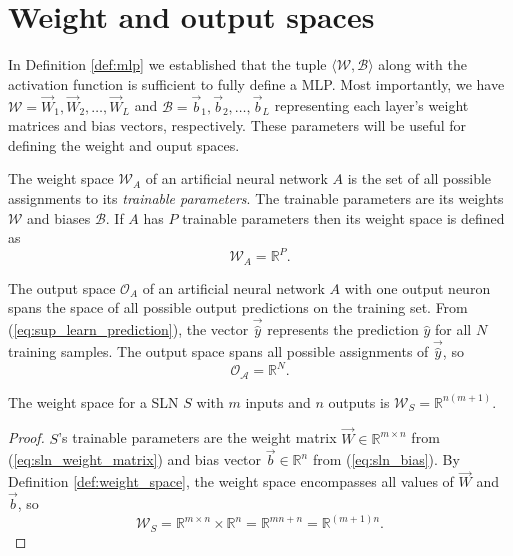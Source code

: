\section{Weight and output spaces}
In Definition \ref{def:mlp} we established that the tuple $\langle \mathscr{W}, \mathscr{B} \rangle$ along with the activation function is sufficient to fully define a MLP. 
Most importantly, we have $\mathscr{W} = \vec{W}_1, \vec{W}_2, \dots, \vec{W}_L$ and $\mathscr{B} = \vec{b}_1, \vec{b}_2, \dots, \vec{b}_L$ representing each layer's weight matrices and bias vectors, respectively. 
These parameters will be useful for defining the weight and ouput spaces.

\begin{definition}
    \label{def:weight_space}
    The weight space $\mathcal{W}_A$ of an artificial neural network $A$ is the set of all possible assignments to its \textit{trainable parameters}. 
    The trainable parameters are its weights $\mathscr{W}$ and biases $\mathscr{B}$.
    If $A$ has $P$ trainable parameters then its weight space is defined as
    \begin{equation}
        \mathcal{W}_A = \mathbb{R}^P.
    \end{equation}
\end{definition}

\begin{definition}
    \label{def:output_space}
    The output space $\mathcal{O}_A$ of an artificial neural network $A$ with one output neuron spans the space of all possible output predictions on the training set.
    From (\ref{eq:sup_learn_prediction}), the vector $\vec{\hat{y}}$ represents the prediction $\hat{y}$ for all $N$ training samples.
    The output space spans all possible assignments of $\vec{\hat{y}}$, so
    \begin{equation}
        \mathcal{O_A}=\mathbb{R}^N.
    \end{equation}
\end{definition}

\begin{lemma}
    \label{lmm:weight_space_sln}
    The weight space for a SLN $S$ with $m$ inputs and $n$ outputs is $\mathcal{W}_S = \mathbb{R}^{n(m+1)}$.
\end{lemma}
\begin{proof}
    $S$'s trainable parameters are the weight matrix $\vec{W} \in \mathbb{R}^{m\times n}$ from (\ref{eq:sln_weight_matrix}) and bias vector $\vec{b} \in \mathbb{R}^n$ from (\ref{eq:sln_bias}).
    By Definition \ref{def:weight_space}, the weight space encompasses all values of $\vec{W}$ and $\vec{b}$, so
    \begin{equation*}
        \mathcal{W}_S = \mathbb{R}^{m \times n} \times \mathbb{R}^{n} = \mathbb{R}^{m n + n} = \mathbb{R}^{(m + 1) n}.
    \end{equation*}
\end{proof}

